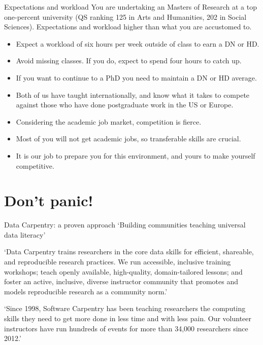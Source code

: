 \documentclass[aspectratio=169, 11pt]{beamer} %
\begin{document}
\begin{frame}{Expectations and workload}
  You are undertaking an Masters of Research at a top one-percent university (QS ranking 125 in Arts and Humanities, 202 in Social Sciences). Expectations and workload higher than what you are accustomed to.
    \begin{itemize}[label=\textbullet]
        \item Expect a workload of six hours per week outside of class to earn a DN or HD.
        \item Avoid missing classes. If you do, expect to spend four hours to catch up.
        \item If you want to continue to a PhD you need to maintain a DN or HD average.
        \item Both of us have taught internationally, and know what it takes to compete against those who have done postgraduate work in the US or Europe.
        \item Considering the academic job market, competition is fierce.
        \item Most of you will not get academic jobs, so transferable skills are crucial.
        \item It is our job to prepare you for this environment, and yours to make yourself competitive.
    \end{itemize}
\end{frame}

\section{Don't panic!}

\begin{frame}{Data Carpentry: a proven approach}
    `Building communities teaching universal data literacy' %
       
    `Data Carpentry trains researchers in the core data skills for efficient, shareable, and reproducible research practices. We run accessible, inclusive training workshops; teach openly available, high-quality, domain-tailored lessons; and foster an active, inclusive, diverse instructor community that promotes and models reproducible research as a community norm.'

    `Since 1998, Software Carpentry has been teaching researchers the computing skills they need to get more done in less time and with less pain. Our volunteer instructors have run hundreds of events for more than 34,000 researchers since 2012.'
\end{frame}
\end{document}
